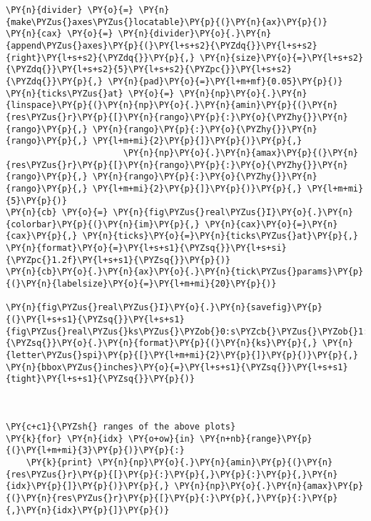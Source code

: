 \begin{Verbatim}[commandchars=\\\{\}]
\PY{n}{divider} \PY{o}{=} \PY{n}{make\PYZus{}axes\PYZus{}locatable}\PY{p}{(}\PY{n}{ax}\PY{p}{)}
\PY{n}{cax} \PY{o}{=} \PY{n}{divider}\PY{o}{.}\PY{n}{append\PYZus{}axes}\PY{p}{(}\PY{l+s+s2}{\PYZdq{}}\PY{l+s+s2}{right}\PY{l+s+s2}{\PYZdq{}}\PY{p}{,} \PY{n}{size}\PY{o}{=}\PY{l+s+s2}{\PYZdq{}}\PY{l+s+s2}{5}\PY{l+s+s2}{\PYZpc{}}\PY{l+s+s2}{\PYZdq{}}\PY{p}{,} \PY{n}{pad}\PY{o}{=}\PY{l+m+mf}{0.05}\PY{p}{)}
\PY{n}{ticks\PYZus{}at} \PY{o}{=} \PY{n}{np}\PY{o}{.}\PY{n}{linspace}\PY{p}{(}\PY{n}{np}\PY{o}{.}\PY{n}{amin}\PY{p}{(}\PY{n}{res\PYZus{}r}\PY{p}{[}\PY{n}{rango}\PY{p}{:}\PY{o}{\PYZhy{}}\PY{n}{rango}\PY{p}{,} \PY{n}{rango}\PY{p}{:}\PY{o}{\PYZhy{}}\PY{n}{rango}\PY{p}{,} \PY{l+m+mi}{2}\PY{p}{]}\PY{p}{)}\PY{p}{,}
                       \PY{n}{np}\PY{o}{.}\PY{n}{amax}\PY{p}{(}\PY{n}{res\PYZus{}r}\PY{p}{[}\PY{n}{rango}\PY{p}{:}\PY{o}{\PYZhy{}}\PY{n}{rango}\PY{p}{,} \PY{n}{rango}\PY{p}{:}\PY{o}{\PYZhy{}}\PY{n}{rango}\PY{p}{,} \PY{l+m+mi}{2}\PY{p}{]}\PY{p}{)}\PY{p}{,} \PY{l+m+mi}{5}\PY{p}{)} 
\PY{n}{cb} \PY{o}{=} \PY{n}{fig\PYZus{}real\PYZus{}I}\PY{o}{.}\PY{n}{colorbar}\PY{p}{(}\PY{n}{im}\PY{p}{,} \PY{n}{cax}\PY{o}{=}\PY{n}{cax}\PY{p}{,} \PY{n}{ticks}\PY{o}{=}\PY{n}{ticks\PYZus{}at}\PY{p}{,} \PY{n}{format}\PY{o}{=}\PY{l+s+s1}{\PYZsq{}}\PY{l+s+si}{\PYZpc{}1.2f}\PY{l+s+s1}{\PYZsq{}}\PY{p}{)}
\PY{n}{cb}\PY{o}{.}\PY{n}{ax}\PY{o}{.}\PY{n}{tick\PYZus{}params}\PY{p}{(}\PY{n}{labelsize}\PY{o}{=}\PY{l+m+mi}{20}\PY{p}{)}

\PY{n}{fig\PYZus{}real\PYZus{}I}\PY{o}{.}\PY{n}{savefig}\PY{p}{(}\PY{l+s+s1}{\PYZsq{}}\PY{l+s+s1}{fig\PYZus{}real\PYZus{}ks\PYZus{}\PYZob{}0:s\PYZcb{}\PYZus{}\PYZob{}1:s\PYZcb{}}\PY{l+s+s1}{\PYZsq{}}\PY{o}{.}\PY{n}{format}\PY{p}{(}\PY{n}{ks}\PY{p}{,} \PY{n}{letter\PYZus{}spi}\PY{p}{[}\PY{l+m+mi}{2}\PY{p}{]}\PY{p}{)}\PY{p}{,} \PY{n}{bbox\PYZus{}inches}\PY{o}{=}\PY{l+s+s1}{\PYZsq{}}\PY{l+s+s1}{tight}\PY{l+s+s1}{\PYZsq{}}\PY{p}{)}



\PY{c+c1}{\PYZsh{} ranges of the above plots}
\PY{k}{for} \PY{n}{idx} \PY{o+ow}{in} \PY{n+nb}{range}\PY{p}{(}\PY{l+m+mi}{3}\PY{p}{)}\PY{p}{:}
    \PY{k}{print} \PY{n}{np}\PY{o}{.}\PY{n}{amin}\PY{p}{(}\PY{n}{res\PYZus{}r}\PY{p}{[}\PY{p}{:}\PY{p}{,}\PY{p}{:}\PY{p}{,}\PY{n}{idx}\PY{p}{]}\PY{p}{)}\PY{p}{,} \PY{n}{np}\PY{o}{.}\PY{n}{amax}\PY{p}{(}\PY{n}{res\PYZus{}r}\PY{p}{[}\PY{p}{:}\PY{p}{,}\PY{p}{:}\PY{p}{,}\PY{n}{idx}\PY{p}{]}\PY{p}{)}


\end{Verbatim}
